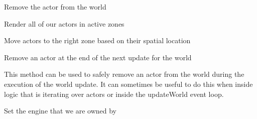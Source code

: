 \documentclass[letterpaper,10pt,english]{sphinxmanual}
\begin{document}
\begin{fulllineitems}
\begin{fulllineitems}
\end{fulllineitems}


\begin{fulllineitems}
\label{world:serge.world.World.removeActor}
Remove the actor from the world

\end{fulllineitems}


\begin{fulllineitems}
\label{world:serge.world.World.renderTo}
Render all of our actors in active zones

\end{fulllineitems}


\begin{fulllineitems}
\label{world:serge.world.World.rezoneActors}
Move actors to the right zone based on their spatial location

\end{fulllineitems}


\begin{fulllineitems}
\label{world:serge.world.World.scheduleActorRemoval}
Remove an actor at the end of the next update for the world

This method can be used to safely remove an actor from the world
during the execution of the world update. It can sometimes be
useful to do this when inside logic that is iterating over actors
or inside the updateWorld event loop.

\end{fulllineitems}


\begin{fulllineitems}
\label{world:serge.world.World.setEngine}
Set the engine that we are owned by

\end{fulllineitems}


\end{fulllineitems}
\end{document}
